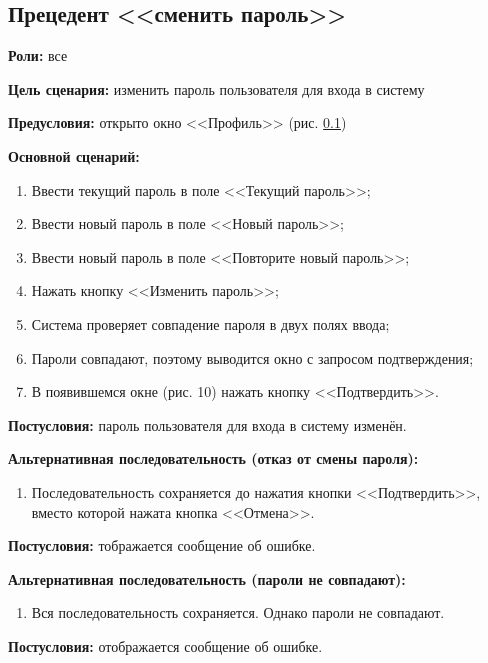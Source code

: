 \subsection{Прецедент <<сменить пароль>>}
\textbf{Роли:} все \par
\textbf{Цель сценария:} изменить пароль пользователя для входа в систему \par
\textbf{Предусловия:} открыто окно <<Профиль>> (рис. \ref{}) \par
\textbf{Основной сценарий:} 
\begin{enumerate}
    \item Ввести текущий пароль в поле <<Текущий пароль>>;
    \item Ввести новый пароль в поле <<Новый пароль>>;
    \item Ввести новый пароль в поле <<Повторите новый пароль>>;
    \item Нажать кнопку <<Изменить пароль>>;
    \item Система проверяет совпадение пароля в двух полях ввода;
    \item Пароли совпадают, поэтому выводится окно с запросом подтверждения;
    \item В появившемся окне (рис. 10) нажать кнопку <<Подтвердить>>.
\end{enumerate} \par
\textbf{Постусловия:} пароль пользователя для входа в систему изменён. \par
\textbf{Альтернативная последовательность (отказ от смены пароля):} \par
\begin{enumerate}
    \item Последовательность сохраняется до нажатия кнопки <<Подтвердить>>, 
        вместо которой нажата кнопка <<Отмена>>.
\end{enumerate} \par
\textbf{Постусловия:} тображается сообщение об ошибке. \par
\textbf{Альтернативная последовательность (пароли не совпадают):} \par
\begin{enumerate}
    \item Вся последовательность сохраняется. Однако пароли не совпадают.
\end{enumerate} \par
\textbf{Постусловия:} отображается сообщение об ошибке. \par

